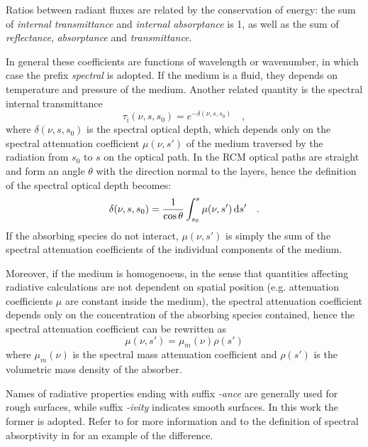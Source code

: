 \documentclass[a4paper,10pt,twocolumn,\classoptions]{article}
\begin{document}
Ratios between radiant fluxes are related by the conservation of energy: the sum of \emph{internal transmittance} and \emph{internal absorptance} is 1, as well as the sum of \emph{reflectance}, \emph{absorptance} and \emph{transmittance}.

In general these coefficients are functions of wavelength or wavenumber, in which case the prefix \emph{spectral} is adopted. If the medium is a fluid, they depends on temperature and pressure of the medium.
Another related quantity is the spectral internal transmittance
\begin{equation}
  \label{eq:spectral_internal_transmittance}
  \tau_\text{i}(\nu, s, s_0) = e^{-\delta(\nu, s, s_0)}
  \quad ,
\end{equation}
where $\delta(\nu, s, s_0)$ is the spectral optical depth, which depends only on the spectral attenuation coefficient $\mu(\nu, s')$ of the medium traversed by the radiation from $s_0$ to $s$ on the optical path. In the RCM optical paths are straight and form an angle $\theta$ with the direction normal to the layers, hence the definition of the spectral optical depth becomes:
\begin{equation}
  \label{eq:spectral_optical_depth}
  \delta(\nu, s, s_0) = \frac{1}{\cos \theta} \int_{s_0}^{s} \mu(\nu, s') \odif{s'}
  \quad .
\end{equation}
If the absorbing species do not interact, $\mu(\nu, s')$ is simply the sum of the spectral attenuation coefficients of the individual components of the medium.

Moreover, if the medium is homogenoeus, in the sense that quantities affecting radiative calculations are not dependent on spatial position (e.g. attenuation coefficients $\mu$ are constant inside the medium), the spectral attenuation coefficient depends only on the concentration of the absorbing species contained, hence the spectral attenuation coefficient can be rewritten as
\begin{equation}
  \label{eq:spectral_attenuation_coefficient}
  \mu(\nu, s') = \mu_m(\nu) \rho(s')
\end{equation}
where $\mu_m(\nu)$ is the spectral mass attenuation coefficient and $\rho(s')$ is the volumetric mass density of the absorber.

Names of radiative properties ending with suffix \emph{-ance} are generally used for rough surfaces, while suffix \emph{-ivity} indicates smooth surfaces. In this work the former is adopted. Refer to \cite[20]{Modest} for more information and to the definition of spectral absorptivity in \cite{CIE} for an example of the difference.
\end{document}
